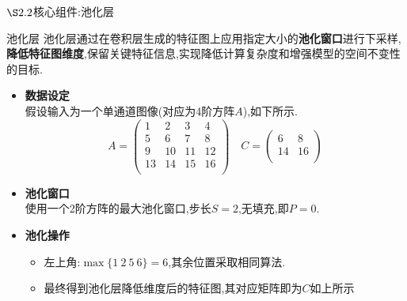 \documentclass{beamer}
\begin{document}
\begin{frame}{$\S2.2$核心组件:池化层}
    \begin{block}{池化层}
        池化层通过在卷积层生成的特征图上应用指定大小的\textbf{池化窗口}进行下采样,\textbf{降低特征图维度},保留关键特征信息,实现降低计算复杂度和增强模型的空间不变性的目标.
    \end{block}
    
    \begin{itemize}
        \item \textbf{数据设定}
        \\假设输入为一个单通道图像(对应为4阶方阵$A$),如下所示.
        \[
            A=    
            \begin{pmatrix}
                1&2&3&4\\
                5&6&7&8\\
                9&10&11&12\\
                13&14&15&16\\
            \end{pmatrix}
            \quad C=
            \begin{pmatrix}
                6&8\\
                14&16\\
            \end{pmatrix}
        \]
        \item \textbf{池化窗口}\\使用一个2阶方阵的最大池化窗口,步长$S=2$,无填充,即$P=0$.
        \item \textbf{池化操作}
        \begin{itemize}
            \item 左上角:$\max\{1~2~5~6\}=6$,其余位置采取相同算法.
            \item 最终得到池化层降低维度后的特征图,其对应矩阵即为$C$如上所示
        \end{itemize}
    \end{itemize}
\end{frame}
\end{document}
